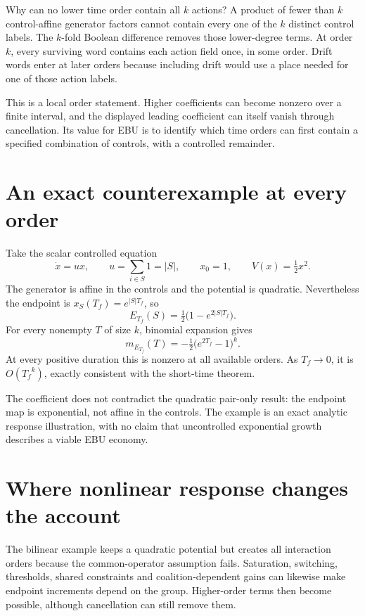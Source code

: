 Why can no lower time order contain all $k$ actions? A product of fewer than $k$ control-affine generator factors cannot contain every one of the $k$ distinct control labels. The $k$-fold Boolean difference removes those lower-degree terms. At order $k$, every surviving word contains each action field once, in some order. Drift words enter at later orders because including drift would use a place needed for one of those action labels.

This is a local order statement. Higher coefficients can become nonzero over a finite interval, and the displayed leading coefficient can itself vanish through cancellation. Its value for EBU is to identify which time orders can first contain a specified combination of controls, with a controlled remainder.

\section{An exact counterexample at every order}
Take the scalar controlled equation
\begin{equation}
 \dot x=u x,\qquad u=\sum_{i\in S}1=|S|,
 \qquad x_0=1,\qquad V(x)=\tfrac12x^2.
\end{equation}
The generator is affine in the controls and the potential is quadratic. Nevertheless the endpoint is $x_S({T_f})=e^{|S|{T_f}}$, so
\begin{equation}
 E_{T_f}(S)=\tfrac12\bigl(1-e^{2|S|{T_f}}\bigr).
\end{equation}
For every nonempty $T$ of size $k$, binomial expansion gives
\begin{equation}\label{eq:bilinear-all-orders}
 m_{E_{T_f}}(T)=-\tfrac12\bigl(e^{2{T_f}}-1\bigr)^k.
\end{equation}
At every positive duration this is nonzero at all available orders. As ${T_f}\to0$, it is $O({T_f}^k)$, exactly consistent with the short-time theorem.

The coefficient does not contradict the quadratic pair-only result: the endpoint map is exponential, not affine in the controls. The example is an exact analytic response illustration, with no claim that uncontrolled exponential growth describes a viable EBU economy.

\section{Where nonlinear response changes the account}
The bilinear example keeps a quadratic potential but creates all interaction orders because the common-operator assumption fails. Saturation, switching, thresholds, shared constraints and coalition-dependent gains can likewise make endpoint increments depend on the group. Higher-order terms then become possible, although cancellation can still remove them.


